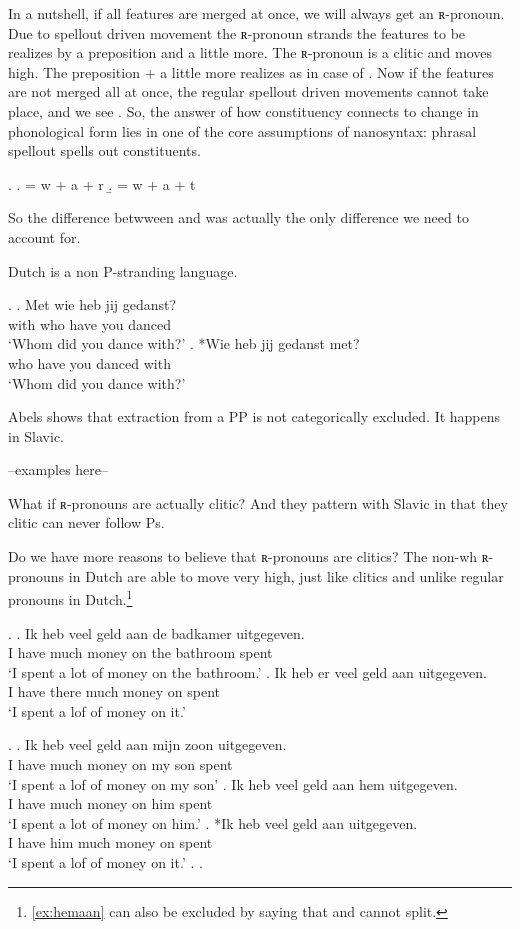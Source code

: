 \documentclass{article}
\begin{document}
In a nutshell, if all features are merged at once, we will always get an ʀ-pronoun. Due to spellout driven movement the ʀ-pronoun strands the features to be realizes by a preposition and a little more. The ʀ-pronoun is a clitic and moves high. The preposition + a little more realizes as  in case of . Now if the features are not merged all at once, the regular spellout driven movements cannot take place, and we see . So, the answer of how constituency connects to change in phonological form lies in one of the core assumptions of nanosyntax: phrasal spellout spells out constituents.

\ex.
\a.  = w + a + r
\b.  = w + a + t

So the difference betwween  and  was actually the only difference we need to account for.

Dutch is a non P-stranding language.

\ex.
\ag. Met wie heb jij gedanst?\\
 with who have you danced\\
 `Whom did you dance with?'
\bg. *Wie heb jij gedanst met?\\
 who have you danced with\\
 `Whom did you dance with?'

Abels shows that extraction from a PP is not categorically excluded. It happens in Slavic.

--examples here--

What if ʀ-pronouns are actually clitic? And they pattern with Slavic in that they clitic can never follow Ps.

Do we have more reasons to believe that ʀ-pronouns are clitics? The non-wh ʀ-pronouns in Dutch are able to move very high, just like clitics and unlike regular pronouns in Dutch.\footnote{\ref{ex:hemaan} can also be excluded by saying that  and  cannot split.}

\ex.
\ag. Ik heb veel geld aan de badkamer uitgegeven.\\
 I have much money on the bathroom spent\\
 `I spent a lot of money on the bathroom.'
\bg. Ik heb er veel geld aan uitgegeven.\\
 I have there much money on spent\\
 `I spent a lof of money on it.'

\ex.
\ag. Ik heb veel geld aan mijn zoon uitgegeven.\\
 I have much money on my son spent\\
 `I spent a lof of money on my son'
\bg. Ik heb veel geld aan hem uitgegeven.\\
 I have much money on him spent\\
 `I spent a lot of money on him.'
\bg. *Ik heb  veel geld aan uitgegeven.\\
 I have him much money on spent\\
 `I spent a lof of money on it.'\label{ex:hemaan}
\z.
\z.
\end{document}
